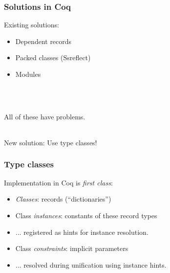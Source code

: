 \documentclass{beamer}
\begin{document}
\begin{frame}
\frametitle{Solutions in Coq}
Existing solutions:
\begin{itemize}
\item Dependent records
\item Packed classes (Ssreflect)
\item Modules
\end{itemize}
\ \\
\ \\
\pause

All of these have problems.

\ \\
New solution: Use type classes!

\end{frame}

\begin{frame}
\frametitle{Type classes}

Implementation in Coq is \emph{first class}:
\begin{itemize}
\item \emph{Classes}: records (``dictionaries'')
\item Class \emph{instances}: constants of these record types
\item ... registered as hints for instance resolution.
\item Class \emph{constraints}: implicit parameters
\item ... resolved during unification using instance hints.
\end{itemize}

\end{frame}
\end{document}
